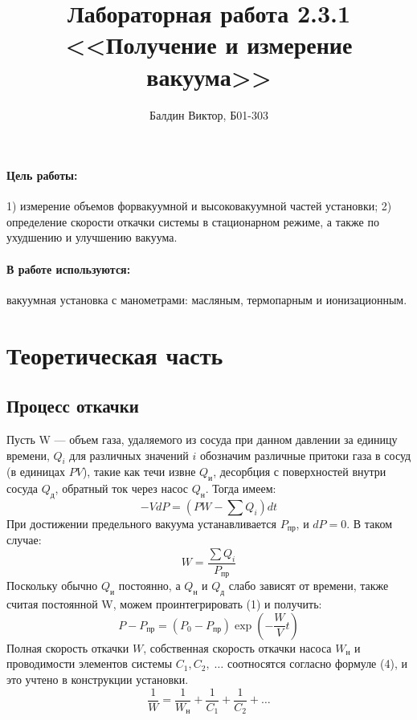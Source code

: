 \documentclass[12pt]{article}
\title{ 
Лабораторная работа 2.3.1 \\
<<Получение и измерение вакуума>>
}
\author{Балдин Виктор, Б01-303}
\begin{document}
 
    \maketitle

    \paragraph{Цель работы:} 1) измерение объемов форвакуумной и высоковакуумной
    частей установки; 
    2) определение скорости откачки системы в стационарном режиме, 
    а также по ухудшению и улучшению вакуума.
    \paragraph{В работе используются:} вакуумная установка с манометрами: масляным,
    термопарным и ионизационным.

    \section{Теоретическая часть}
    \subsection{Процесс откачки}

    Пусть W --- объем газа, удаляемого из
    сосуда при данном давлении за единицу времени, $Q_i$ для различных значений
    $i$ обозначим различные притоки газа в сосуд (в единицах $PV$), такие как
    течи извне $Q_\text{и}$, десорбция с поверхностей внутри сосуда
    $Q_\text{д}$, обратный ток через насос $Q_\text{н}$. Тогда имеем:
    \begin{equation} -VdP = \left(PW - \sum Q_i\right)dt \end{equation} При
    достижении предельного вакуума устанавливается $P_{\text{пр}}$, и $dP = 0$.
    В таком случае: \begin{equation} W = \frac{\sum Q_i}{ P_{\text{пр}}}
    \end{equation} Поскольку обычно $Q_\text{и}$ постоянно, а $Q_\text{н}$ и
    $Q_\text{д}$ слабо зависят от времени, также считая постоянной W, можем
    проинтегрировать (1) и получить: \begin{equation} P - P_{\text{пр}} = (P_0 -
    P_{\text{пр}})\exp\left(-\frac{W}{V}t\right) \label{exp} \end{equation}
    Полная скорость откачки $W$, собственная скорость откачки насоса
    $W_{\text{н}}$ и проводимости элементов системы $C_1, C_2,\;\ldots$
    соотносятся согласно формуле (4), и это учтено в конструкции установки.
    \begin{equation} \frac{1}{W} = \frac{1}{W_\text{н}} + \frac{1}{C_1} +
    \frac{1}{C_2} + \ldots \end{equation}
\end{document}
